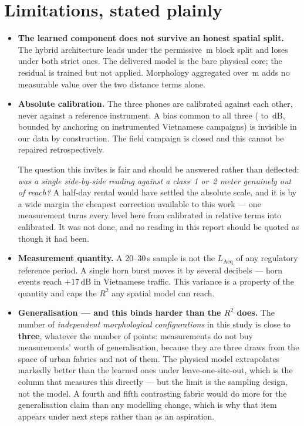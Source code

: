 \documentclass[11pt,a4paper]{article}
\newcommand{\dB}{\ensuremath{\,\mathrm{dB}}}
\begin{document}
\section{Limitations, stated plainly}

\begin{itemize}
  \item \textbf{The learned component does not survive an honest spatial split.}
        The hybrid architecture leads under the permissive \blockM\,m block split
        and loses under both strict ones. The delivered model is the bare
        physical core; the residual is trained but not applied. Morphology
        aggregated over \bufferM\,m adds no measurable value over the two
        distance terms alone.

  \item \textbf{Absolute calibration.} The three phones are calibrated against
        each other, never against a reference instrument. A bias common to all
        three (\biasLo{} to \biasHi\dB{}, bounded by anchoring on instrumented
        Vietnamese campaigns) is invisible in our data by construction. The field
        campaign is closed and this cannot be repaired retrospectively.

        \smallskip
        The question this invites is fair and should be answered rather than
        deflected: \emph{was a single side-by-side reading against a class~1 or~2
        meter genuinely out of reach?} A half-day rental would have settled the
        absolute scale, and it is by a wide margin the cheapest correction
        available to this work --- one measurement turns every level here from
        calibrated in relative terms into calibrated. It was not done, and no
        reading in this report should be quoted as though it had been.

  \item \textbf{Measurement quantity.} A 20--30\,s sample is not the
        $L_\mathrm{Aeq}$ of any regulatory reference period. A single horn burst
        moves it by several decibels --- horn events reach $+17\dB$ in Vietnamese
        traffic. This variance is a property of the quantity and caps the $R^2$
        any spatial model can reach.

  \item \textbf{Generalisation --- and this binds harder than the $R^2$ does.}
        The number of \emph{independent morphological configurations} in this
        study is close to \textbf{three}, whatever the number of points:
        \nMeas{} measurements do not buy \nMeas{} measurements' worth of
        generalisation, because they are three draws from the space of urban
        fabrics and not \nMeas{} of them. The physical model extrapolates
        markedly better than the learned ones under leave-one-site-out, which is
        the column that measures this directly --- but the limit is the sampling
        design, not the model. A fourth and fifth contrasting fabric would do
        more for the generalisation claim than any modelling change, which is why
        that item appears under next steps rather than as an aspiration.


\end{itemize}
\end{document}
